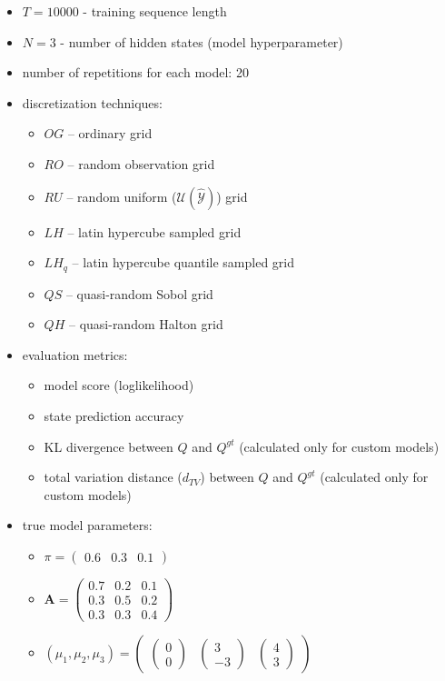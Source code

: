 \documentclass[shortabstract]{iithesis}
\begin{document}
\begin{itemize}
    \item $T = 10000$ - training sequence length
    \item $N = 3$ - number of hidden states (model hyperparameter)
    \item number of repetitions for each model: 20
    \item discretization techniques:
    \begin{itemize}
        \item $OG$ -- ordinary grid 
        \item $RO$ -- random observation grid 
        \item $RU$ -- random uniform ($\mathcal U (\hat{\mathcal Y})$) grid 
        \item $LH$ -- latin hypercube sampled grid 
        \item $LH_q$ -- latin hypercube quantile sampled grid 
        \item $QS$ -- quasi-random Sobol grid 
        \item $QH$ -- quasi-random Halton grid 
    \end{itemize}
    \item evaluation metrics:
    \begin{itemize}
        \item model score (loglikelihood)
        \item state prediction accuracy
        \item KL divergence between $Q$ and $Q^{gt}$ (calculated only for custom models)
        \item total variation distance ($d_{TV}$) between $Q$ and $Q^{gt}$ (calculated only for custom models)
    \end{itemize}
    \item true model parameters:
    \begin{itemize}
        \item $\pi = \left(\begin{array}{ccc} 0.6 & 0.3 & 0.1 \end{array}\right)$ 
        \item $\textbf{A} = \left(\begin{array}{ccc} 0.7 & 0.2 & 0.1 \\ 0.3 & 0.5 & 0.2 \\ 0.3 & 0.3 & 0.4 \end{array}\right)$ 
        \item $(\mu_1, \mu_2, \mu_3) = \left(\begin{array}{ccc}\left(\begin{array}{c} 0 \\ 0 \end{array}\right) & \left(\begin{array}{c} 3 \\ -3 \end{array}\right) & \left(\begin{array}{c} 4 \\ 3 \end{array}\right)\end{array}\right)$ 

\end{itemize}
\end{itemize}
\end{document}
